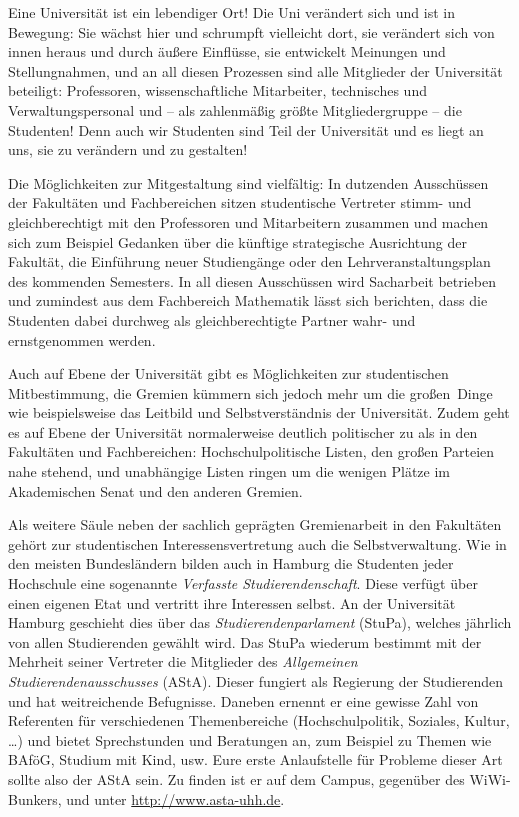 \label{page:siv}
Eine Universität ist ein lebendiger Ort! Die Uni verändert sich und ist in
Bewegung: Sie wächst hier und schrumpft vielleicht dort, sie verändert sich von
innen heraus und durch äußere Einflüsse, sie entwickelt Meinungen und
Stellungnahmen, und an all diesen Prozessen sind alle Mitglieder der
Universität beteiligt: Professoren, wissenschaftliche Mitarbeiter, technisches
und Verwaltungspersonal und -- als zahlenmäßig größte Mitgliedergruppe -- die
Studenten! Denn auch wir Studenten sind Teil der Universität und es liegt an
uns, sie zu verändern und zu gestalten! 

Die Möglichkeiten zur Mitgestaltung sind vielfältig: In dutzenden Ausschüssen
der Fakultäten und Fachbereichen sitzen studentische Vertreter stimm- und
gleichberechtigt mit den Professoren und Mitarbeitern zusammen und machen sich
zum Beispiel Gedanken über die künftige strategische Ausrichtung der Fakultät,
die Einführung neuer Studiengänge oder den Lehrveranstaltungsplan des kommenden
Semesters. In all diesen Ausschüssen wird Sacharbeit betrieben und zumindest
aus dem Fachbereich Mathematik lässt sich berichten, dass die Studenten dabei
durchweg als gleichberechtigte Partner wahr- und ernstgenommen werden. 

Auch auf Ebene der Universität gibt es Möglichkeiten zur studentischen
Mitbestimmung, die Gremien kümmern sich jedoch mehr um die \glqq großen\grqq\
Dinge wie beispielsweise das Leitbild und Selbstverständnis der Universität.
Zudem geht es auf Ebene der Universität normalerweise deutlich politischer zu
als in den Fakultäten und Fachbereichen: Hochschulpolitische Listen, den großen
Parteien nahe stehend, und unabhängige Listen ringen um die wenigen Plätze im
Akademischen Senat und den anderen Gremien.

Als weitere Säule neben der sachlich geprägten Gremienarbeit in den Fakultäten
gehört zur studentischen Interessensvertretung auch die Selbstverwaltung. Wie
in den meisten Bundesländern bilden auch in Hamburg die Studenten jeder
Hochschule eine sogenannte \emph{Verfasste Studierendenschaft}. Diese verfügt
über einen eigenen Etat und vertritt ihre Interessen selbst. An der Universität
Hamburg geschieht dies über das \emph{Studierendenparlament} (StuPa), welches
jährlich von allen Studierenden gewählt wird. Das StuPa wiederum bestimmt mit
der Mehrheit seiner Vertreter die Mitglieder des \emph{Allgemeinen
Studierendenausschusses} (AStA). Dieser fungiert als Regierung der Studierenden
und hat weitreichende Befugnisse. Daneben ernennt er eine gewisse Zahl von
Referenten für verschiedenen Themenbereiche (Hochschulpolitik, Soziales,
Kultur, \ldots) und bietet Sprechstunden und Beratungen an, zum Beispiel zu
Themen wie BAföG, Studium mit Kind, usw. Eure erste Anlaufstelle für Probleme
dieser Art sollte also der AStA sein. Zu finden ist er auf dem Campus,
gegenüber des WiWi-Bunkers, und unter \url{http://www.asta-uhh.de}.


